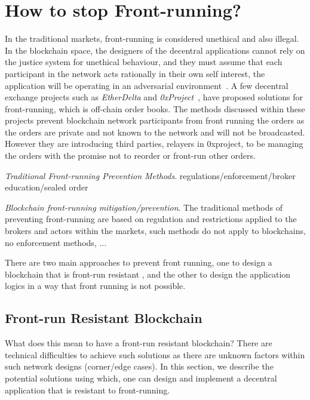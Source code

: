 \section{How to stop Front-running?} %

In the traditional markets, front-running is considered unethical and also illegal. In the blockchain space, the designers of the decentral applications cannot rely on the justice system for unethical behaviour, and they must assume that each participant in the network acts rationally in their own self interest, the application will be operating in an adversarial environment~\cite{0xfrontrunning:online}.
A few decentral exchange projects such as \textit{EtherDelta} and \textit{0xProject}~\cite{warren20170x}, have proposed solutions for front-running, which is off-chain order books. The methods discussed within these projects prevent blockchain network participants from front running the orders as the orders are private and not known to the network and will not be broadcasted. However they are introducing third parties, \eg relayers in 0xproject, to be managing the orders with the promise not to reorder or front-run other orders. 

\emph{Traditional Front-running Prevention Methods}. regulations/enforcement/broker education/sealed order


\emph{Blockchain front-running mitigation/prevention}. The traditional methods of preventing front-running are based on regulation and restrictions applied to the brokers and actors within the markets, such methods do not apply to blockchains, no enforcement methods, ... 

There are two main approaches to prevent front running, one to design a blockchain that is front-run resistant , and the other to design the application logics in a way that front running is not possible. 

\subsection{Front-run Resistant Blockchain}
What does this mean to have a front-run resistant blockchain?  There are technical difficulties to achieve such solutions as there are unknown factors within such network designs (corner/edge cases). In this section, we describe the potential solutions using which, one can design and implement a decentral application that is resistant to front-running.

